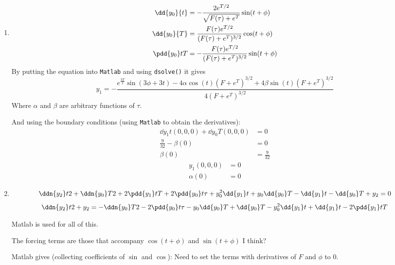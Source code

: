\documentclass{X:/Documents/Coding/Latex/myassignment}
\begin{document}
\begin{enumerate}
\begin{enumerate}
		\item %
		\begin{align*}
			\dd{y_0}{t} &= -\frac{2e^{T/2}}{\sqrt{F(\tau) + e^{T}}}\sin(t+\phi) \\
			\dd{y_0}{T} &= \frac{F(\tau)e^{T/2}}{(F(\tau) +e^{T})^{3/2}} \cos(t+\phi)\\
			\pdd{y_0}tT &= -\frac{F(\tau)e^{T/2}}{(F(\tau) +e^{T})^{3/2}} \sin(t+\phi)
		\end{align*}
		By putting the equation into \verb|Matlab| and using \verb|dsolve()| it gives
		\[y_1 = -\frac{e^{\frac{3T}{2}}\sin\left(3\phi +3t\right)-4\alpha\cos\left(t\right)\left(F+e^T\right)^{3/2}+4\beta\sin\left(t\right)\left(F+e^T\right)^{3/2} }{4\left(F+e^T\right)^{3/2}}\]
		Where $\alpha$ and $\beta$ are arbitrary functions of $\tau$.

		And using the boundary conditions (using \verb|Matlab| to obtain the derivatives):
		\begin{align*}
			\dd{y_1}{t}(0,0,0) + \dd{y_0}{T}(0,0,0) &= 0 \\
			\frac{9}{32} - \beta(0) &=0\\
			\beta(0) &= \frac{9}{32}
		\end{align*}
		\begin{align*}
			y_1(0,0,0) &= 0\\
			\alpha(0) &= 0 
		\end{align*}


		\item %
		\[\ddn{y_2}t2 + \ddn{y_0}T2 + 2\pdd{y_1}tT + 2\pdd{y_0}t\tau + y_0^2 \dd{y_1}t + y_0\dd{y_0}T - \dd{y_1}t - \dd{y_0}T + y_2 = 0\]
		\[\ddn{y_2}t2 + y_2 = -\ddn{y_0}T2 - 2\pdd{y_0}t\tau -y_0 \dd{y_0}T + \dd{y_0}T - y_0^2 \dd{y_1}t + \dd{y_1}t - 2\pdd{y_1}tT\]


		Matlab is used for all of this.

		The forcing terms are those that accompany $\cos(t+\phi)$ and $\sin(t+\phi)$ I think?

		Matlab gives (collecting coefficients of $\sin$ and $\cos$):
		Need to set the terms with derivatives of $F$ and $\phi$ to $0$.



\end{enumerate}
\end{enumerate}
\end{document}
